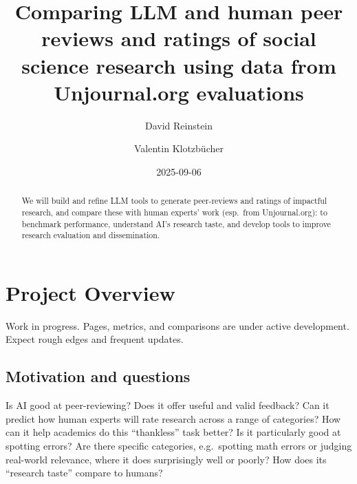 \documentclass[
  11pt,
  letterpaper,
  DIV=11,
  numbers=noendperiod]{scrreprt}
\title{Comparing LLM and human peer reviews and ratings of social
science research using data from Unjournal.org evaluations}
\author{David Reinstein \and Valentin Klotzbücher}
\date{2025-09-06}
\renewcommand*\contentsname{Table of contents}
\newcommand\contentsname{Table of contents}
\begin{document}
\maketitle
\begin{abstract}
We will build and refine LLM tools to generate peer-reviews and ratings
of impactful research, and compare these with human experts' work
(esp.~from Unjournal.org): to benchmark performance, understand AI's
research taste, and develop tools to improve research evaluation and
dissemination.
\end{abstract}

\renewcommand*\contentsname{Table of contents}
{
\hypersetup{linkcolor=}
\setcounter{tocdepth}{2}
\tableofcontents
}

\chapter{Project Overview}\label{project-overview}

\begin{tcolorbox}[enhanced jigsaw, bottomrule=.15mm, coltitle=black, arc=.35mm, left=2mm, opacityback=0, title=\textcolor{quarto-callout-warning-color}{\faExclamationTriangle}\hspace{0.5em}{Warning}, colframe=quarto-callout-warning-color-frame, breakable, leftrule=.75mm, colbacktitle=quarto-callout-warning-color!10!white, titlerule=0mm, colback=white, toprule=.15mm, bottomtitle=1mm, toptitle=1mm, rightrule=.15mm, opacitybacktitle=0.6]

Work in progress. Pages, metrics, and comparisons are under active
development. Expect rough edges and frequent updates.

\end{tcolorbox}

\section{Motivation and questions}\label{motivation-and-questions}

Is AI good at peer-reviewing? Does it offer useful and valid feedback?
Can it predict how human experts will rate research across a range of
categories? How can it help academics do this ``thankless'' task better?
Is it particularly good at spotting errors? Are there specific
categories, e.g.~spotting math errors or judging real-world relevance,
where it does surprisingly well or poorly? How does its ``research
taste'' compare to humans?
\end{document}

